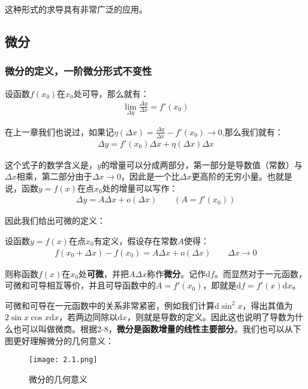 \documentclass{ctexart}
\let\oldtextbf\textbf %
\renewcommand{\textbf}[1]{\textcolor{btex}{\oldtextbf{#1}}} %
\begin{document}
这种形式的求导具有非常广泛的应用。

\subsection{微分}
\subsubsection{微分的定义，一阶微分形式不变性}
设函数$f(x_0)$在$x_0$处可导，那么就有：
\begin{align*}
    \lim_{\Delta y}\frac{\Delta y}{\Delta x}=f'(x_0)
\end{align*}

在上一章我们也说过，如果记$\eta(\Delta x)=\frac{\Delta y}{\Delta x}-f'(x_0)\to 0$,那么我们就有：
\begin{align*}
    \Delta y=f'(x_0)\Delta x+\eta(\Delta x)\Delta x
\end{align*}

这个式子的数学含义是，$y$的增量可以分成两部分，第一部分是导数值（常数）与$\Delta x$相乘，第二部分由于$\Delta x\to 0$，因此是一个比$\Delta x$更高阶的无穷小量。也就是说，函数$y=f(x)$在点$x_0$处的增量可以写作：
\begin{align*}
    \Delta y=A\Delta x+o(\Delta x)\qquad (A=f'(x_0))
\end{align*}

因此我们给出可微的定义：
\begin{tcolorbox}[
    colback=bac2,     %
    colframe=fra2,   %
    coltitle=white,             %
    coltext=tex2,
    title=微分的定义,
    fonttitle=\bfseries,        %
arc=3mm,                     %
breakable
]
设函数$y=f(x)$在点$x_0$有定义，假设存在常数$A$使得：
\begin{align*}
    f(x_0+\Delta x)-f(x_0)=A\Delta x+o(\Delta x)\qquad \Delta x\to 0\tag{2-8}
\end{align*}

则称函数$f(x)$在$x_0$处\textbf{可微}，并把$A\Delta x$称作\textbf{微分}。记作$\mathrm{d}f$。而显然对于一元函数，可微和可导相互等价，并且可导函数中的$A=f'(x_0)$，即就是\textbf{$\mathrm{d}f=f'(x)\mathrm{d}x$}。
\end{tcolorbox}


可微和可导在一元函数中的关系非常紧密，例如我们计算$\mathrm{d}\sin^2x$，得出其值为$2\sin x\cos x\mathrm{d}x$，若两边同除以$\mathrm{d}x$，则就是导数的定义。因此这也说明了导数为什么也可以叫做微商。根据2-8，\textbf{微分是函数增量的线性主要部分}。我们也可以从下图更好理解微分的几何意义：
\begin{figure}[H]    
\centering     
\renewcommand{\figurename}{图}     
\renewcommand{\thefigure}{2.1}    
\begin{myimagebox}[width=0.45\textwidth] %
\texttt{[image: 2.1.png]} %
\end{myimagebox}     
\caption{\label{fig:2.1}微分的几何意义}   
\end{figure}
\end{document}
